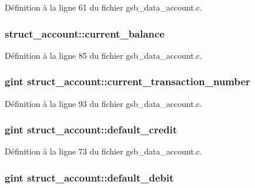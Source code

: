 Définition à la ligne 61 du fichier gsb\_\-data\_\-account.c.

\subsubsection[{current\_\-balance}]{ {\bf struct\_\-account::current\_\-balance}}\label{structstruct__account_af2eb1a763da4cc94034f1fa0f128669e}


Définition à la ligne 85 du fichier gsb\_\-data\_\-account.c.

\subsubsection[{current\_\-transaction\_\-number}]{\setlength{\rightskip}{0pt plus 5cm}gint {\bf struct\_\-account::current\_\-transaction\_\-number}}\label{structstruct__account_a8e420de632b12b43d87d6b10c5823c11}


Définition à la ligne 93 du fichier gsb\_\-data\_\-account.c.

\subsubsection[{default\_\-credit}]{\setlength{\rightskip}{0pt plus 5cm}gint {\bf struct\_\-account::default\_\-credit}}\label{structstruct__account_a03792fdbc49c2e4f516858858f89e417}


Définition à la ligne 73 du fichier gsb\_\-data\_\-account.c.

\subsubsection[{default\_\-debit}]{\setlength{\rightskip}{0pt plus 5cm}gint {\bf struct\_\-account::default\_\-debit}}\label{structstruct__account_a2c4bdcadd683dc3392440aa48f351043}


